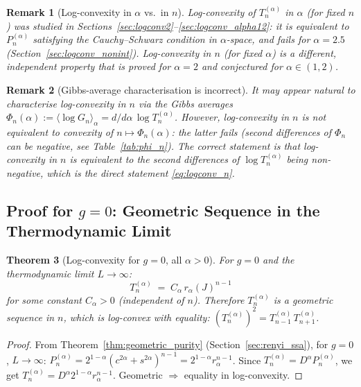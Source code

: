 \documentclass[12pt,a4paper]{article}
\newtheorem{theorem}{Theorem}[section]
\newtheorem{remark}[theorem]{Remark}
\begin{document}
\begin{remark}[Log-convexity in $\alpha$ vs.\ in $n$]
Log-convexity of $T_n^{(\alpha)}$ in $\alpha$ (for fixed $n$) was studied in
Sections~\ref{sec:logconv2}--\ref{sec:logconv_alpha12}: it is equivalent to
$P_n^{(\alpha)}$ satisfying the Cauchy--Schwarz condition in $\alpha$-space,
and fails for $\alpha=2.5$ (Section~\ref{sec:logconv_nonint}).
Log-convexity in $n$ (for fixed $\alpha$) is a different, independent property
that is proved for $\alpha=2$ and conjectured for $\alpha\in(1,2)$.
\end{remark}

\begin{remark}[Gibbs-average characterisation is incorrect]
It may appear natural to characterise log-convexity in $n$ via the Gibbs
averages $\Phi_n(\alpha):=\langle\log G_n\rangle_\alpha = d/d\alpha\,\log T_n^{(\alpha)}$.
However, log-convexity in $n$ is \emph{not} equivalent to convexity of
$n\mapsto\Phi_n(\alpha)$: the latter fails (second differences of $\Phi_n$ can be
negative, see Table~\ref{tab:phi_n}).
The correct statement is that log-convexity in $n$ is equivalent to
the second differences of $\log T_n^{(\alpha)}$ being non-negative,
which is the direct statement \eqref{eq:logconv_n}.
\end{remark}

\subsection{Proof for $g=0$: Geometric Sequence in the Thermodynamic Limit}
\label{sec:g0_geom}

\begin{theorem}[Log-convexity for $g=0$, all $\alpha>0$]
\label{thm:g0_logconv_n}
For $g=0$ and the thermodynamic limit $L\to\infty$:
\[
  T_n^{(\alpha)} \;=\; C_\alpha\,r_\alpha(J)^{n-1}
\]
for some constant $C_\alpha>0$ (independent of $n$).  Therefore $T_n^{(\alpha)}$
is a geometric sequence in $n$, which is log-convex with equality:
$(T_n^{(\alpha)})^2 = T_{n-1}^{(\alpha)}\,T_{n+1}^{(\alpha)}$.
\end{theorem}

\begin{proof}
From Theorem~\ref{thm:geometric_purity} (Section~\ref{sec:renyi_ssa}),
for $g=0$, $L\to\infty$:
$P_n^{(\alpha)} = 2^{1-\alpha}(c^{2\alpha}+s^{2\alpha})^{n-1} = 2^{1-\alpha}r_\alpha^{n-1}$.
Since $T_n^{(\alpha)} = D^\alpha P_n^{(\alpha)}$, we get $T_n^{(\alpha)} = D^\alpha 2^{1-\alpha} r_\alpha^{n-1}$.
Geometric $\Rightarrow$ equality in log-convexity.
\end{proof}
\end{document}
